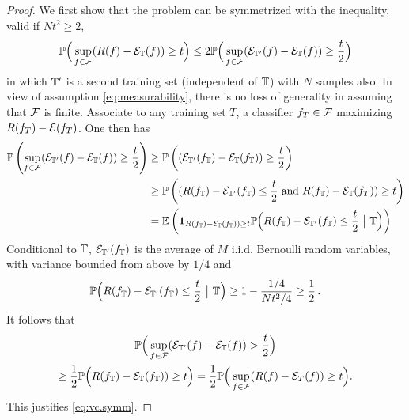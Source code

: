 \begin{proof}
We first show that the problem can be symmetrized with the inequality, valid  if $Nt^2 \geq 2$, 
\begin{equation}
\label{eq:vc.symm}
\bm{\mathbb P}\Big(\sup_{f\in{\mathcal F}} (R(f) - {\mathcal E}_{\mathbb T}(f)) \geq t\Big) \leq 2\bm{\mathbb P}\Big(\sup_{f\in{\mathcal F}} ({\mathcal E}_{{\mathbb T}'}(f) - {\mathcal E}_{{\mathbb T}}(f)) \geq \frac t 2\Big)
\end{equation}
in which ${\mathbb T}'$ is a second training set (independent of ${\mathbb T}$) with $N$ samples also. In view of assumption \cref{eq:measurability}, there is no loss of generality in assuming that ${\mathcal F}$ is finite. Associate to  any training set $T$, a classifier $f_T\in {\mathcal F}$ maximizing  $R(f_T) - {\mathcal E}(f_T) $. One then has
\begin{align*}
\bm{\mathbb P}\left(\sup_{f\in{\mathcal F}} ({\mathcal E}_{{\mathbb T}'}(f) - {\mathcal E}_{{\mathbb T}}(f)) \geq \frac t 2\right) & \geq \bm{\mathbb P}\left(({\mathcal E}_{{\mathbb T}'}(f_{\mathbb T}) - {\mathcal E}_{{\mathbb T}}(f_{\mathbb T})) \geq \frac t 2\right)\\
& \geq \bm{\mathbb P}\left((R(f_{\mathbb T}) - {\mathcal E}_{{\mathbb T}'}(f_{{\mathbb T}}) \leq \frac t 2\text{ and } R(f_{\mathbb T}) - {\mathcal E}_{{\mathbb T}}(f_T)) \geq t\right)\\
& = \bm{\mathbb E}\left( {\bm 1}_{R(f_{\mathbb T}) - {\mathcal E}_{{\mathbb T}}(f_{\mathbb T})) \geq  t} \bm{\mathbb P}\Big(R(f_{\mathbb T}) - {\mathcal E}_{{\mathbb T}'}(f_{{\mathbb T}}) \leq \frac t 2\ \big|\ {\mathbb T}\Big) \right)
\end{align*}
Conditional to ${\mathbb T}$, ${\mathcal E}_{{\mathbb T}'}(f_{{\mathbb T}})$ is the average of $M$ i.i.d. Bernoulli random variables, with variance bounded from above by $1/4$ and 
\[
\bm{\mathbb P}\Big(R(f_{{\mathbb T}}) - {\mathcal E}_{{\mathbb T}'}(f_{{\mathbb T}}) \leq \frac t 2\ \big |\ {\mathbb T}\Big) \geq 
1 - \frac{1/4}{Nt^2/4} \geq \frac12\,.
\]
It follows that 
\begin{multline*}
\bm{\mathbb P}\Big(\sup_{f\in{\mathcal F}} ({\mathcal E}_{{\mathbb T}'}(f) - {\mathcal E}_{{\mathbb T}}(f)) > \frac t2\Big) \\
\geq \frac12 \bm{\mathbb P}\Big(R(f_{\mathbb T}) - {\mathcal E}_{{\mathbb T}}(f_{\mathbb T})) \geq  t\Big) = \frac12 \bm{\mathbb P}\Big(\sup_{f\in{\mathcal F}} (R(f) - {\mathcal E}_T(f)) \geq t\Big).
\end{multline*}
This justifies \cref{eq:vc.symm}.




%


\end{proof}
